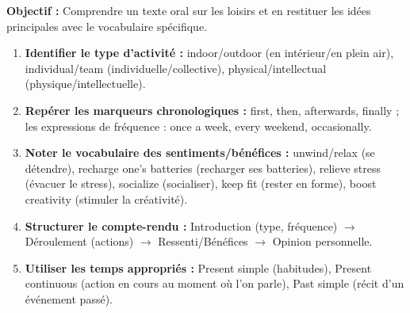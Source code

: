 \documentclass[11pt]{article}
\newcommand{\cle}[1]{{\popxbold\color{popdark}#1}}
\begin{document}
\begin{methode}
\textbf{Objectif :} Comprendre un texte oral sur les loisirs et en restituer les idées principales avec le vocabulaire spécifique.
\begin{enumerate}
    \item \textbf{Identifier le type d'activité :} \cle{indoor/outdoor} (en intérieur/en plein air), \cle{individual/team} (individuelle/collective), \cle{physical/intellectual} (physique/intellectuelle).
    \item \textbf{Repérer les marqueurs chronologiques :} \cle{first, then, afterwards, finally} ; les expressions de fréquence : \cle{once a week, every weekend, occasionally}.
    \item \textbf{Noter le vocabulaire des sentiments/bénéfices :} \cle{unwind/relax} (se détendre), \cle{recharge one's batteries} (recharger ses batteries), \cle{relieve stress} (évacuer le stress), \cle{socialize} (socialiser), \cle{keep fit} (rester en forme), \cle{boost creativity} (stimuler la créativité).
    \item \textbf{Structurer le compte-rendu :} Introduction (type, fréquence) $\rightarrow$ Déroulement (actions) $\rightarrow$ Ressenti/Bénéfices $\rightarrow$ Opinion personnelle.
    \item \textbf{Utiliser les temps appropriés :} \cle{Present simple} (habitudes), \cle{Present continuous} (action en cours au moment où l'on parle), \cle{Past simple} (récit d'un événement passé).
\end{enumerate}
\end{methode}
\end{document}

